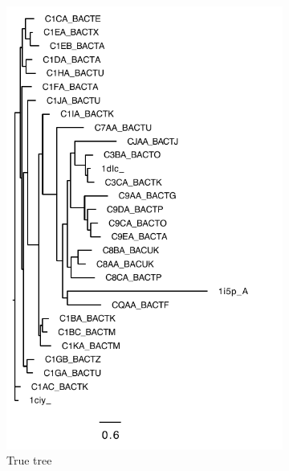 \begin{figure}[!h]
	\begin{adjustwidth}{-1cm}{-1cm}
		\centering
		\begin{subfigure}[b]{0.25\textwidth}
			\includegraphics[width=\columnwidth]{Figure/tree/BB20010_true_tree}
			\caption{True tree}
\end{subfigure}    
		\begin{subfigure}[b]{0.25\textwidth}

\end{subfigure}
\end{adjustwidth}
\end{figure}
